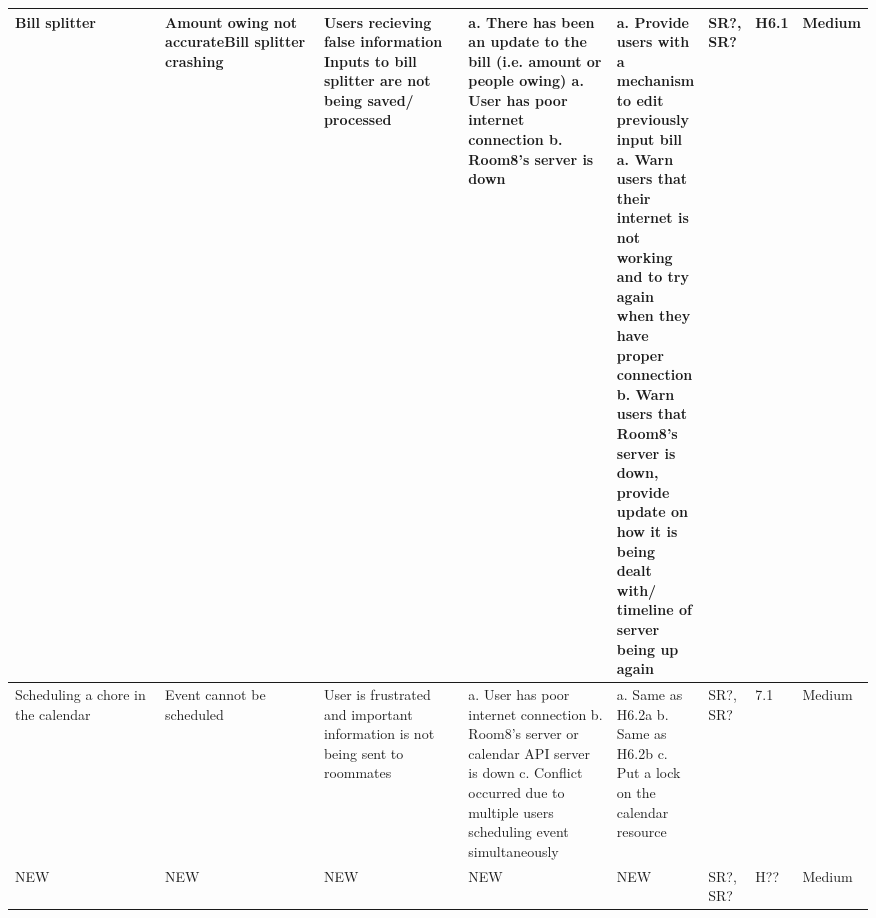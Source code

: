 \documentclass{article}
\begin{document}
\begin{table}[H]
\begin{adjustbox}{width=\textwidth}
\begin{tabular}{|p{0.25\linewidth} | p{0.25\linewidth} | p{0.22\linewidth}|  p{0.22\linewidth}|  p{0.30\linewidth}|  p{0.085\linewidth}|  p{0.05\linewidth}|p{0.12\linewidth}| }
         \raggedright Bill splitter &\raggedright Amount owing not accurate\newline\newline\newline\newline Bill splitter crashing \ &\raggedright Users recieving false information \newline\newline\newline\newline Inputs to bill splitter are not being saved/ processed &\raggedright a. There has been an update to the bill (i.e. amount or people owing) \newline\newline a. User has poor internet connection \newline b. Room8's server is down  &\raggedright a. Provide users with a mechanism to edit previously input bill \newline\newline\newline a. Warn users that their internet is not working and to try again when they have proper connection \newline b. Warn users that Room8's server is down, provide update on how it is being dealt with/ timeline of server being up again & SR?, SR? & H6.1 & Medium\\
         \hline
         \raggedright Scheduling a chore in the calendar &\raggedright Event cannot be scheduled &\raggedright User is frustrated and important information is not being sent to roommates &\raggedright a. User has poor internet connection \newline b. Room8's server or calendar API server is down \newline c. Conflict occurred due to multiple users scheduling event simultaneously &\raggedright a. Same as H6.2a \newline b. Same as H6.2b \newline c. Put a lock on the calendar resource & SR?, SR? & 7.1 & Medium\\
         \hline
         NEW & NEW\newline & NEW & NEW & NEW & SR?, SR? & H?? & Medium\\
         \hline
    \end{tabular}
    \end{adjustbox}
    \label{tab:my_label}
\end{table}


\newpage
\end{document}
